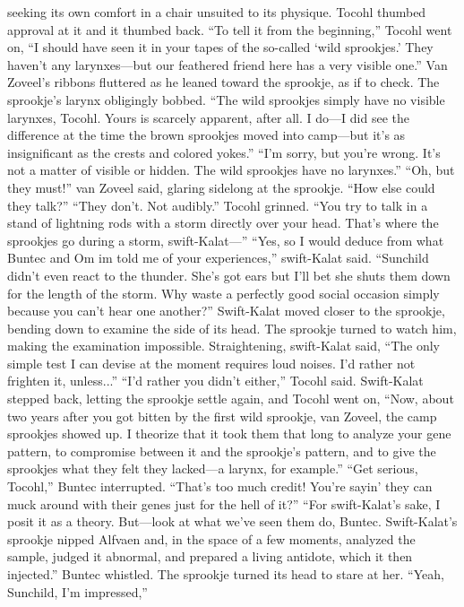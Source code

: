 \documentclass[9pt]{article}
\begin{document}
seeking its own comfort in a chair unsuited to its physique. Tocohl thumbed approval at it and it thumbed
back.
“To tell it from the beginning,” Tocohl went on, “I should have seen it in your tapes of the so-called
‘wild sprookjes.’ They haven’t any larynxes—but our feathered friend here has a very visible one.”
Van Zoveel’s ribbons fluttered as he leaned toward the sprookje, as if to check. The sprookje’s
larynx obligingly bobbed. “The wild sprookjes simply have no visible larynxes, Tocohl. Yours is scarcely
apparent, after all. I do—I did see the difference at the time the brown sprookjes moved into camp—but
it’s as insignificant as the crests and colored yokes.”
“I’m sorry, but you’re wrong. It’s not a matter of visible or hidden. The wild sprookjes have no
larynxes.”
“Oh, but they must!” van Zoveel said, glaring sidelong at the sprookje. “How else could they talk?”
“They don’t. Not audibly.” Tocohl grinned. “You try to talk in a stand of lightning rods with a storm
directly over your head. That’s where the sprookjes go during a storm, swift-Kalat—”
“Yes, so I would deduce from what Buntec and Om im told me of your experiences,” swift-Kalat
said.
“Sunchild didn’t even react to the thunder. She’s got ears but I’ll bet she shuts them down for the
length of the storm. Why waste a perfectly good social occasion simply because you can’t hear one
another?”
Swift-Kalat moved closer to the sprookje, bending down to examine the side of its head. The
sprookje turned to watch him, making the examination impossible. Straightening, swift-Kalat said, “The
only simple test I can devise at the moment requires loud noises. I’d rather not frighten it, unless...”
“I’d rather you didn’t either,” Tocohl said.
Swift-Kalat stepped back, letting the sprookje settle again, and Tocohl went on, “Now, about two
years after you got bitten by the first wild sprookje, van Zoveel, the camp sprookjes showed up. I
theorize that it took them that long to analyze your gene pattern, to compromise between it and the
sprookje’s pattern, and to give the sprookjes what they felt they lacked—a larynx, for example.”
“Get serious, Tocohl,” Buntec interrupted. “That’s too much credit! You’re sayin’ they can muck
around with their genes just for the hell of it?”
“For swift-Kalat’s sake, I posit it as a theory. But—look at what we’ve seen them do, Buntec.
Swift-Kalat’s sprookje nipped Alfvaen and, in the space of a few moments, analyzed the sample, judged
it abnormal, and prepared a living antidote, which it then injected.”
Buntec whistled. The sprookje turned its head to stare at her. “Yeah, Sunchild, I’m impressed,”
\end{document}
